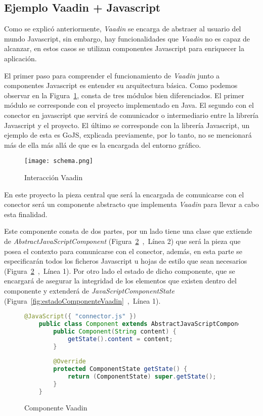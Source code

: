 \subsection{Ejemplo Vaadin + Javascript}

Como se explicó anteriormente, \emph{Vaadin} se encarga de abstraer al usuario del mundo Javascript, sin embargo, hay funcionalidades que \emph{Vaadin} no es capaz de alcanzar, en estos casos se utilizan componentes Javascript para enriquecer la aplicación.

El primer paso para comprender el funcionamiento de \emph{Vaadin} junto a componentes Javascript es entender su arquitectura básica. Como podemos observar en la Figura~\ref{fig:schema}, consta de tres módulos bien diferenciados. El primer módulo se corresponde con el proyecto implementado en Java. El segundo con el conector en javascript que servirá de comunicador o intermediario entre la librería Javascript y el proyecto. El último se corresponde con la librería Javascript, un ejemplo de esta es GoJS, explicada previamente, por lo tanto, no se mencionará más de ella más allá de que es la encargada del entorno gráfico.



\begin{figure}[!tb]
	\centering
	\texttt{[image: schema.png]}
	\caption{Interacción Vaadin}\label{fig:schema}
\end{figure}




En este proyecto la pieza central que será la encargada de comunicarse con el conector será un componente abstracto que implementa \emph{Vaadin} para llevar a cabo esta finalidad.

Este componente consta de dos partes, por un lado tiene una clase que extiende de \emph{AbstractJavaScriptComponent} (Figura~\ref{fig:componenteVaadin}~,~Línea 2) que será la pieza que posea el contexto para comunicarse con el conector, además, en esta parte se especificarán todos los ficheros Javascript u hojas de estilo que sean necesarios (Figura~\ref{fig:componenteVaadin}~,~Línea 1). Por otro lado el estado de dicho componente, que se encargará de asegurar la integridad de los elementos que existen dentro del componente y extenderá de \emph{JavaScriptComponentState} (Figura~\ref{fig:estadoComponenteVaadin}~,~Línea 1).

\begin{figure}[!tb]
	\centering
	\begin{lstlisting}[language=Java]
	@JavaScript({ "connector.js" })
	public class Component extends AbstractJavaScriptComponent {
		public Component(String content) {
			getState().content = content;
		}
		
		@Override
		protected ComponentState getState() {
			return (ComponentState) super.getState();
		}
	}\end{lstlisting}
	\caption{Componente Vaadin}
	\label{fig:componenteVaadin}
\end{figure}



